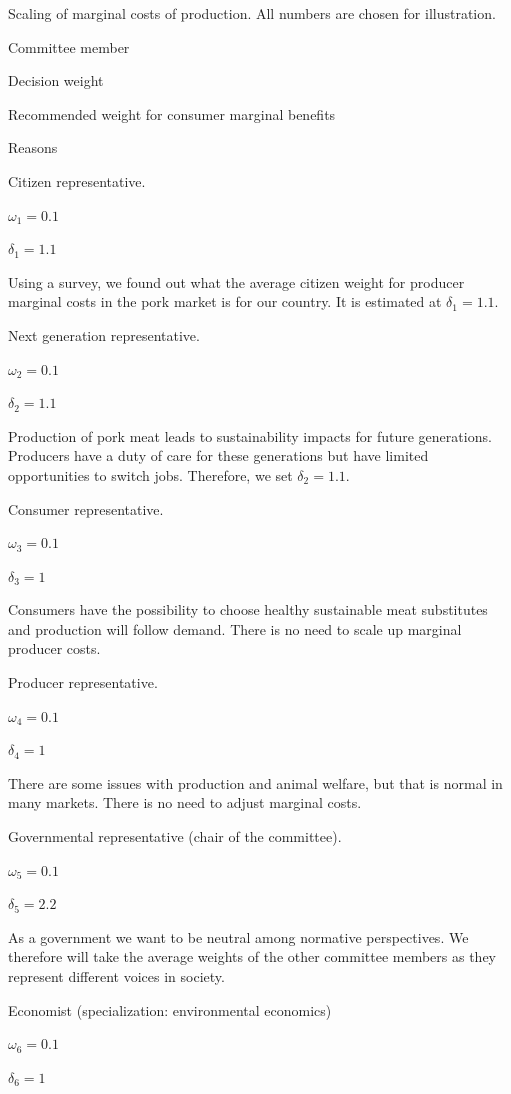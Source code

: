 \documentclass[
]{book}
\begin{document}
\label{tab:scalingmarginal}Scaling of marginal costs of production. All numbers are chosen for illustration.

Committee member

Decision weight

Recommended weight for consumer marginal benefits

Reasons

Citizen representative.

\(\omega_1 = 0.1\)

\(\delta_1 = 1.1\)

Using a survey, we found out what the average citizen weight for producer marginal costs in the pork market is for our country. It is estimated at \(\delta_1=1.1\).

Next generation representative.

\(\omega_2 = 0.1\)

\(\delta_2 = 1.1\)

Production of pork meat leads to sustainability impacts for future generations. Producers have a duty of care for these generations but have limited opportunities to switch jobs. Therefore, we set \(\delta_2=1.1\).

Consumer representative.

\(\omega_3 = 0.1\)

\(\delta_3 = 1\)

Consumers have the possibility to choose healthy sustainable meat substitutes and production will follow demand. There is no need to scale up marginal producer costs.

Producer representative.

\(\omega_4 = 0.1\)

\(\delta_4 = 1\)

There are some issues with production and animal welfare, but that is normal in many markets. There is no need to adjust marginal costs.

Governmental representative (chair of the committee).

\(\omega_5 = 0.1\)

\(\delta_5 = 2.2\)

As a government we want to be neutral among normative perspectives. We therefore will take the average weights of the other committee members as they represent different voices in society.

Economist (specialization: environmental economics)

\(\omega_6 = 0.1\)

\(\delta_6 = 1\)
\end{document}
